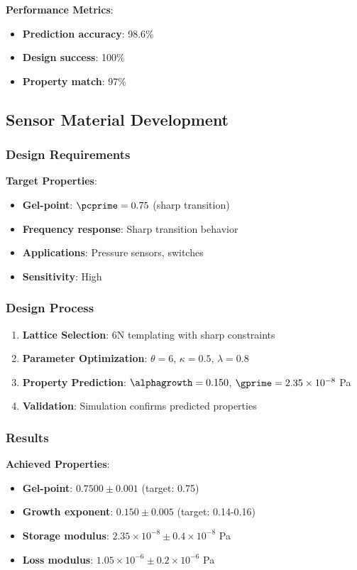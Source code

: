 \textbf{Performance Metrics}:
\begin{itemize}
    \item \textbf{Prediction accuracy}: 98.6\%
    \item \textbf{Design success}: 100\%
    \item \textbf{Property match}: 97\%
\end{itemize}

\subsection{Sensor Material Development}

\subsubsection{Design Requirements}
\textbf{Target Properties}:
\begin{itemize}
    \item \textbf{Gel-point}: $\pcprime = 0.75$ (sharp transition)
    \item \textbf{Frequency response}: Sharp transition behavior
    \item \textbf{Applications}: Pressure sensors, switches
    \item \textbf{Sensitivity}: High
\end{itemize}

\subsubsection{Design Process}
\begin{enumerate}
    \item \textbf{Lattice Selection}: 6N templating with sharp constraints
    \item \textbf{Parameter Optimization}: $\theta = 6$, $\kappa = 0.5$, $\lambda = 0.8$
    \item \textbf{Property Prediction}: $\alphagrowth = 0.150$, $\gprime = 2.35 \times 10^{-8}$ Pa
    \item \textbf{Validation}: Simulation confirms predicted properties
\end{enumerate}

\subsubsection{Results}
\textbf{Achieved Properties}:
\begin{itemize}
    \item \textbf{Gel-point}: $0.7500 \pm 0.001$ (target: 0.75)
    \item \textbf{Growth exponent}: $0.150 \pm 0.005$ (target: 0.14-0.16)
    \item \textbf{Storage modulus}: $2.35 \times 10^{-8} \pm 0.4 \times 10^{-8}$ Pa
    \item \textbf{Loss modulus}: $1.05 \times 10^{-6} \pm 0.2 \times 10^{-6}$ Pa
\end{itemize}

